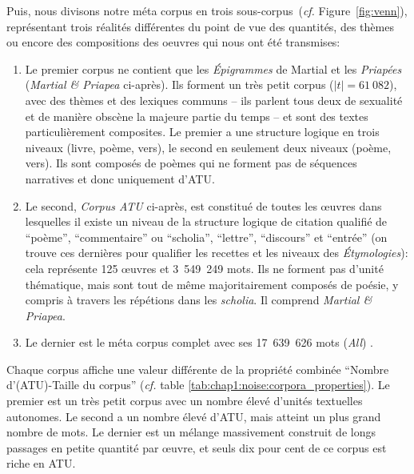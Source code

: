 Puis, nous divisons notre méta corpus en trois sous-corpus~(\textit{cf.} Figure~\ref{fig:venn}), représentant trois réalités différentes du point de vue des quantités, des thèmes ou encore des compositions des oeuvres qui nous ont été transmises:
\begin{enumerate}
    \item Le premier corpus ne contient que les \textit{Épigrammes} de Martial et les \textit{Priapées} (\textit{Martial \& Priapea} ci-après). Ils forment un très petit corpus ($\left | t \right |=61~082$), avec des thèmes et des lexiques communs -- ils parlent tous deux de sexualité et de manière obscène la majeure partie du temps -- et sont des textes particulièrement composites. Le premier a une structure logique en trois niveaux (livre, poème, vers), le second en seulement deux niveaux (poème, vers). Ils sont composés de poèmes qui ne forment pas de séquences narratives et donc uniquement d'ATU.
    \item Le second, \textit{Corpus ATU} ci-après, est constitué de toutes les œuvres dans lesquelles il existe un niveau de la structure logique de citation qualifié de ``poème'', ``commentaire'' ou ``scholia'', ``lettre'', ``discours'' et ``entrée'' (on trouve ces dernières pour qualifier les recettes et les niveaux des \textit{Étymologies}): cela représente 125 œuvres et 3~549~249 mots. Ils ne forment pas d'unité thématique, mais sont tout de même majoritairement composés de poésie, y compris à travers les répétions dans les \textit{scholia}. Il comprend \textit{Martial \& Priapea}.
    \item Le dernier est le méta corpus complet avec ses 17~639~626 mots (\textit{All}) .
\end{enumerate}

Chaque corpus affiche une valeur différente de la propriété combinée ``Nombre d'(ATU)-Taille du corpus'' (\textit{cf.} table \ref{tab:chap1:noise:corpora_properties}). Le premier est un très petit corpus avec un nombre élevé d'unités textuelles autonomes. Le second a un nombre élevé d'ATU, mais atteint un plus grand nombre de mots. Le dernier est un mélange massivement construit de longs passages en petite quantité par œuvre, et seuls dix pour cent de ce corpus est riche en ATU.

